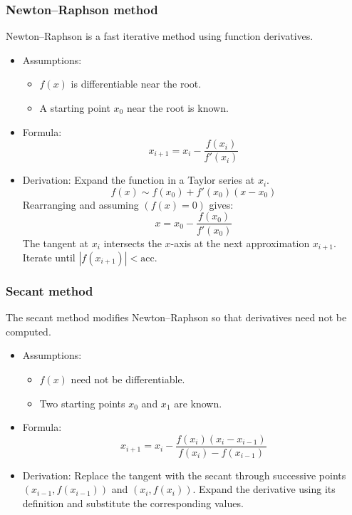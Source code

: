 \subsubsection{Newton--Raphson method}
Newton--Raphson is a fast iterative method using function derivatives.

\begin{itemize}
    \item Assumptions:
    \begin{itemize}
        \item \( f(x) \) is differentiable near the root.
        \item A starting point \( x_0 \) near the root is known.
    \end{itemize}
    \item Formula:
    \[ x_{i+1} = x_i - \frac{f(x_i)}{f'(x_i)} \]
    \item Derivation:
    Expand the function in a Taylor series at \( x_i \).
    \[
    f(x) \sim f(x_0) + f'(x_0)(x - x_0) 
    \]
    Rearranging and assuming $(f(x) = 0)$ gives:
    \[
    x = x_0 - \frac{f(x_0)}{f'(x_0)}
    \]
    The tangent at \( x_i \) intersects the \( x \)-axis at the next approximation \( x_{i+1} \). Iterate until \( |f(x_{i+1})| < \text{acc} \).
\end{itemize}

\subsubsection{Secant method}
The secant method modifies Newton--Raphson so that derivatives need not be computed.

\begin{itemize}
    \item Assumptions:
    \begin{itemize}
        \item \( f(x) \) need not be differentiable.
        \item Two starting points \( x_0 \) and \( x_1 \) are known.
    \end{itemize}
    \item Formula:
    \[ x_{i+1} = x_i - \frac{f(x_i)(x_i - x_{i-1})}{f(x_i) - f(x_{i-1})} \]
    \item Derivation:
    Replace the tangent with the secant through successive points \((x_{i-1}, f(x_{i-1}))\) and \((x_i, f(x_i))\). Expand the derivative using its definition and substitute the corresponding values.
\end{itemize}

